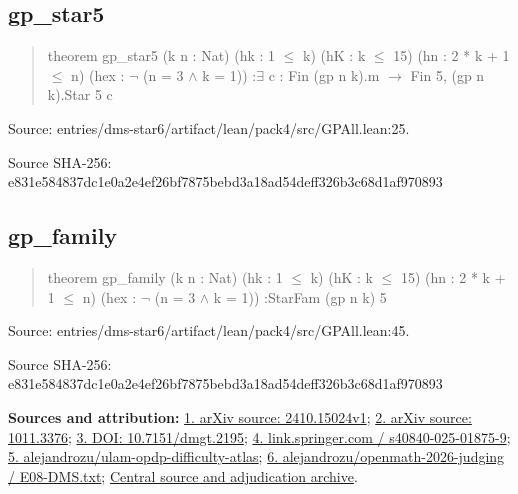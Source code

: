 \documentclass[11pt,a4paper]{article}
\begin{document}
\begin{samepage}
\subsection{gp\_star5}
\begin{quote}\small\ttfamily theorem gp\_star5 (k n : Nat) (hk : 1 \ensuremath{\leq} k) (hK : k \ensuremath{\leq} 15) (hn : 2 * k + 1 \ensuremath{\leq} n) (hex : \ensuremath{\neg} (n = 3 \ensuremath{\wedge} k = 1)) :\newline     \ensuremath{\exists} c : Fin (gp n k).m \ensuremath{\to} Fin 5, (gp n k).Star 5 c\end{quote}
{\small Source: entries/dms-star6/artifact/lean/pack4/src/GPAll.lean:25.\par}

{\small Source SHA-256: e831e584837dc1e0a2e4ef26bf7875bebd3a18ad54deff326b3c68d1af970893\par}

\end{samepage}
\begin{samepage}
\subsection{gp\_family}
\begin{quote}\small\ttfamily theorem gp\_family (k n : Nat) (hk : 1 \ensuremath{\leq} k) (hK : k \ensuremath{\leq} 15) (hn : 2 * k + 1 \ensuremath{\leq} n) (hex : \ensuremath{\neg} (n = 3 \ensuremath{\wedge} k = 1)) :\newline     StarFam (gp n k) 5\end{quote}
{\small Source: entries/dms-star6/artifact/lean/pack4/src/GPAll.lean:45.\par}

{\small Source SHA-256: e831e584837dc1e0a2e4ef26bf7875bebd3a18ad54deff326b3c68d1af970893\par}

{\small\textbf{Sources and attribution:} \href{https://arxiv.org/html/2410.15024v1}{1. arXiv source: 2410.15024v1}; \href{https://arxiv.org/abs/1011.3376}{2. arXiv source: 1011.3376}; \href{https://doi.org/10.7151/dmgt.2195}{3. DOI: 10.7151/dmgt.2195}; \href{https://link.springer.com/article/10.1007/s40840-025-01875-9}{4. link.springer.com / s40840-025-01875-9}; \href{https://github.com/alejandrozu/ulam-opdp-difficulty-atlas}{5. alejandrozu/ulam-opdp-difficulty-atlas}; \href{https://github.com/alejandrozu/openmath-2026-judging/blob/d0ed487f487fa7ec814ff705ab55249983fe8707/OpenMath-Judging/review/entries/E08-DMS.txt}{6. alejandrozu/openmath-2026-judging / E08-DMS.txt}; \href{https://github.com/alejandrozu/openmath-2026-judging}{Central source and adjudication archive}.\par}

\end{samepage}
\end{document}
